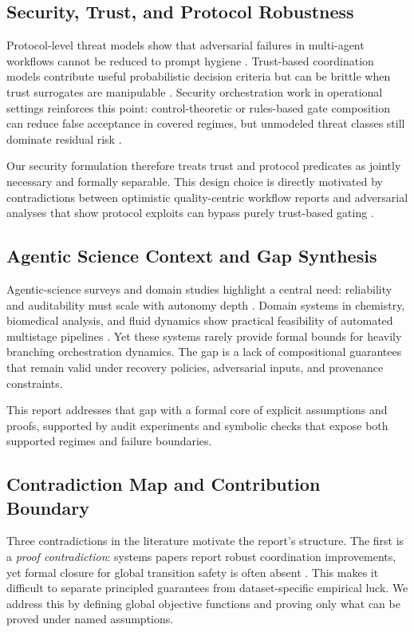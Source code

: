 \documentclass{article} %
\begin{document}
\subsection{Security, Trust, and Protocol Robustness}
Protocol-level threat models show that adversarial failures in multi-agent workflows cannot be reduced to prompt hygiene \citep{ferrag2026,ismail2025}. Trust-based coordination models contribute useful probabilistic decision criteria but can be brittle when trust surrogates are manipulable \citep{gao2025,han2025}. Security orchestration work in operational settings reinforces this point: control-theoretic or rules-based gate composition can reduce false acceptance in covered regimes, but unmodeled threat classes still dominate residual risk \citep{ismail2025,sun2025b,wang2025}.

Our security formulation therefore treats trust and protocol predicates as jointly necessary and formally separable. This design choice is directly motivated by contradictions between optimistic quality-centric workflow reports and adversarial analyses that show protocol exploits can bypass purely trust-based gating \citep{ferrag2026,gao2025,ismail2025,ferrag2025}.

\subsection{Agentic Science Context and Gap Synthesis}
Agentic-science surveys and domain studies highlight a central need: reliability and auditability must scale with autonomy depth \citep{xin2025,reddy2025,wei2025}. Domain systems in chemistry, biomedical analysis, and fluid dynamics show practical feasibility of automated multistage pipelines \citep{pham2026,zhang2025,klang2025,dong2025,stewart2025}. Yet these systems rarely provide formal bounds for heavily branching orchestration dynamics. The gap is a lack of compositional guarantees that remain valid under recovery policies, adversarial inputs, and provenance constraints.

This report addresses that gap with a formal core of explicit assumptions and proofs, supported by audit experiments and symbolic checks that expose both supported regimes and failure boundaries.

\subsection{Contradiction Map and Contribution Boundary}
Three contradictions in the literature motivate the report's structure. The first is a \emph{proof contradiction}: systems papers report robust coordination improvements, yet formal closure for global transition safety is often absent \citep{song2026,chang2025,wang2025b}. This makes it difficult to separate principled guarantees from dataset-specific empirical luck. We address this by defining global objective functions and proving only what can be proved under named assumptions.
\end{document}
